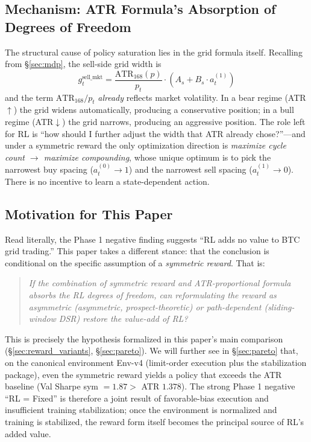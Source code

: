 \documentclass[11pt, a4paper]{article}
\begin{document}
\subsection{Mechanism: ATR Formula's Absorption of Degrees of Freedom}
\label{sec:phase1_mechanism}

The structural cause of policy saturation lies in the grid formula itself.
Recalling from \S\ref{sec:mdp}, the sell-side grid width is
\begin{equation}
g^{\mathrm{sell\_mkt}}_t = \frac{\mathrm{ATR}_{168}(p)}{p_t}
\cdot (A_s + B_s \cdot a_t^{(1)})
\end{equation}
and the term $\mathrm{ATR}_{168}/p_t$ \emph{already} reflects market
volatility. In a bear regime (ATR$\uparrow$) the grid widens automatically,
producing a conservative position; in a bull regime (ATR$\downarrow$) the grid
narrows, producing an aggressive position. The role left for RL is
``how should I further adjust the width that ATR already chose?''---and under
a symmetric reward the only optimization direction is \emph{maximize cycle
count $\to$ maximize compounding}, whose unique optimum is to pick the
narrowest buy spacing ($a_t^{(0)} \to 1$) and the narrowest sell spacing
($a_t^{(1)} \to 0$). There is no incentive to learn a state-dependent action.

\subsection{Motivation for This Paper}
\label{sec:phase1_implication}

Read literally, the Phase 1 negative finding suggests ``RL adds no value to
BTC grid trading.'' This paper takes a different stance: that the conclusion
is conditional on the specific assumption of a \emph{symmetric reward}. That
is:

\begin{quote}
\emph{If the combination of symmetric reward and ATR-proportional formula
absorbs the RL degrees of freedom, can reformulating the reward as
\emph{asymmetric} (asymmetric, prospect-theoretic) or \emph{path-dependent}
(sliding-window DSR) restore the value-add of RL?}
\end{quote}

This is precisely the hypothesis formalized in this paper's main comparison
(\S\ref{sec:reward_variants}, \S\ref{sec:pareto}). We will further see in
\S\ref{sec:pareto} that, on the canonical environment Env-v4 (limit-order
execution plus the stabilization package), even the symmetric reward yields a
policy that exceeds the ATR baseline (Val Sharpe sym $= 1.87 > $ ATR $1.378$).
The strong Phase 1 negative ``RL = Fixed'' is therefore a joint result of
favorable-bias execution and insufficient training stabilization; once the
environment is normalized and training is stabilized, the reward form itself
becomes the principal source of RL's added value.
\end{document}
